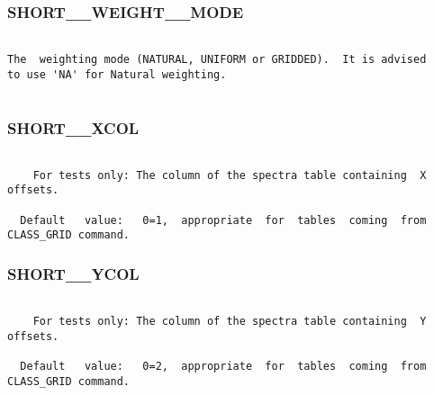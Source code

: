 \subsubsection{SHORT\_\_WEIGHT\_\_MODE}
\begin{verbatim}

The  weighting mode (NATURAL, UNIFORM or GRIDDED).  It is advised
to use 'NA' for Natural weighting.


\end{verbatim}
\subsubsection{SHORT\_\_XCOL}
\begin{verbatim}

    For tests only: The column of the spectra table containing  X
offsets.

  Default   value:   0=1,  appropriate  for  tables  coming  from
CLASS_GRID command.

\end{verbatim}
\subsubsection{SHORT\_\_YCOL}
\begin{verbatim}

    For tests only: The column of the spectra table containing  Y
offsets.

  Default   value:   0=2,  appropriate  for  tables  coming  from
CLASS_GRID command.

\end{verbatim}
